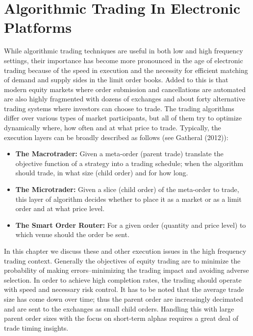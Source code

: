 
\chapter{Algorithmic Trading In Electronic Platforms}

While algorithmic trading techniques are useful in both low and high frequency settings, their importance has become more pronounced in the age of electronic trading because of the speed in execution and the necessity for efficient matching of demand and supply sides in the limit order books. Added to this is that modern equity markets where order submission and cancellations are automated are also highly fragmented with dozens of exchanges and about forty alternative trading systems where investors can choose to trade. The trading algorithms differ over various types of market participants, but all of them try to optimize dynamically where, how often and at what price to trade. Typically, the execution layers can be broadly described as follows (see Gatheral (2012)\cite{}):
	\begin{itemize}
	\item \textbf{The Macrotrader:} Given a meta-order (parent trade) translate the objective function of a strategy into a trading schedule; when the algorithm should trade, in what size (child order) and for how long.
	\item \textbf{The Microtrader:} Given a slice (child order) of the meta-order to trade, this layer of algorithm decides whether to place it as a market or as a  limit order and at what price level.
	\item \textbf{The Smart Order Router:} For a given order (quantity and price level) to which venue should the order be sent.
	\end{itemize}


In this chapter we discuss these and other execution issues in the high frequency trading context. Generally the objectives of equity trading are to minimize the probability of making errors--minimizing the trading impact and avoiding adverse selection. In order to achieve high completion rates, the trading should operate with speed and necessary risk control. It has to be noted that the average trade size has come down over time; thus the parent order are increasingly decimated and are sent to the exchanges as small child orders. Handling this with large parent order sizes with the focus on short-term alphas requires a great deal of trade timing insights.  



